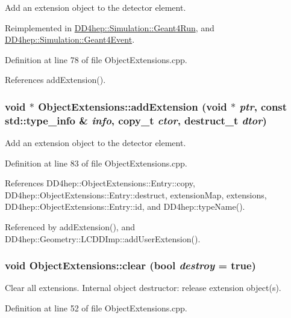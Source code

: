 Add an extension object to the detector element. 

Reimplemented in \hyperlink{class_d_d4hep_1_1_simulation_1_1_geant4_run_aa825451bec9637a51d98d46e23334b75}{DD4hep::Simulation::Geant4Run}, and \hyperlink{class_d_d4hep_1_1_simulation_1_1_geant4_event_aee3baf75d103ea5fbb2e59230392c5d1}{DD4hep::Simulation::Geant4Event}.

Definition at line 78 of file ObjectExtensions.cpp.

References addExtension().\hypertarget{class_d_d4hep_1_1_object_extensions_acfe9fe435a30ca5fedd0678b867732a0}{
\subsubsection[{addExtension}]{\setlength{\rightskip}{0pt plus 5cm}void $\ast$ ObjectExtensions::addExtension (void $\ast$ {\em ptr}, \/  const std::type\_\-info \& {\em info}, \/  {\bf copy\_\-t} {\em ctor}, \/  {\bf destruct\_\-t} {\em dtor})}}
\label{class_d_d4hep_1_1_object_extensions_acfe9fe435a30ca5fedd0678b867732a0}


Add an extension object to the detector element. 

Definition at line 83 of file ObjectExtensions.cpp.

References DD4hep::ObjectExtensions::Entry::copy, DD4hep::ObjectExtensions::Entry::destruct, extensionMap, extensions, DD4hep::ObjectExtensions::Entry::id, and DD4hep::typeName().

Referenced by addExtension(), and DD4hep::Geometry::LCDDImp::addUserExtension().\hypertarget{class_d_d4hep_1_1_object_extensions_a8f55762fa8f1701f8fda19a25b027168}{
\subsubsection[{clear}]{\setlength{\rightskip}{0pt plus 5cm}void ObjectExtensions::clear (bool {\em destroy} = {\ttfamily true})}}
\label{class_d_d4hep_1_1_object_extensions_a8f55762fa8f1701f8fda19a25b027168}


Clear all extensions. Internal object destructor: release extension object(s). 

Definition at line 52 of file ObjectExtensions.cpp.

